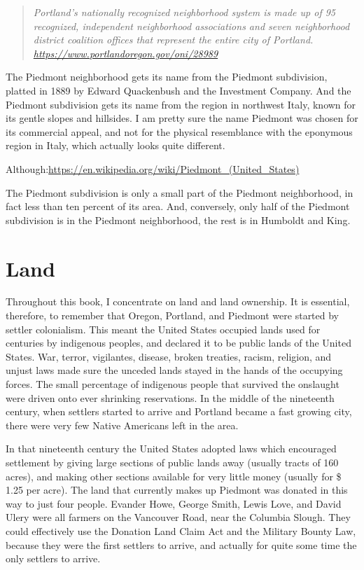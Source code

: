 \documentclass[
  12pt,
]{book}
\begin{document}
\begin{quote}
\emph{Portland's nationally recognized neighborhood system is made up of 95 recognized,
independent neighborhood associations and seven neighborhood district coalition offices
that represent the entire city of Portland.
\url{https://www.portlandoregon.gov/oni/28989}}
\end{quote}

The Piedmont neighborhood gets its name from the Piedmont subdivision, platted in 1889 by Edward Quackenbush and the Investment Company. And the Piedmont subdivision gets its name from the region in northwest Italy, known for its gentle slopes and hillsides. I am pretty sure the name Piedmont was chosen for its commercial appeal, and not for the physical resemblance with the eponymous region in Italy, which actually looks quite different.

Although:\url{https://en.wikipedia.org/wiki/Piedmont_(United_States)}

The Piedmont subdivision is only a small part of the Piedmont neighborhood, in fact less than ten percent of its area. And, conversely, only half of the Piedmont subdivision is in the Piedmont neighborhood, the rest is in Humboldt and King.

\hypertarget{land}{%
\section*{Land}\label{land}}

Throughout this book, I concentrate on land and land ownership. It is essential, therefore, to remember that Oregon, Portland, and Piedmont were started by settler colonialism. This meant the United States occupied lands used for centuries by indigenous peoples, and declared it to be public lands of the United States. War, terror, vigilantes, disease, broken treaties, racism, religion, and unjust laws made sure the unceded lands stayed in the hands of the occupying forces. The small percentage of indigenous people that survived the onslaught were driven onto ever shrinking reservations. In the middle of the nineteenth century, when settlers started to arrive and Portland became a fast growing city, there were very few Native Americans left in the area.

In that nineteenth century the United States adopted laws which encouraged settlement by giving large sections of public lands away (usually tracts of 160 acres), and making other sections available for very little money (usually for \$ 1.25 per acre). The land that currently makes up Piedmont was donated in this way to just four people. Evander Howe, George Smith, Lewis Love, and David Ulery were all farmers on the Vancouver Road, near the Columbia Slough. They could effectively use the Donation Land Claim Act and the Military Bounty Law, because they were the first settlers to arrive, and actually for quite some time the only settlers to arrive.
\end{document}
